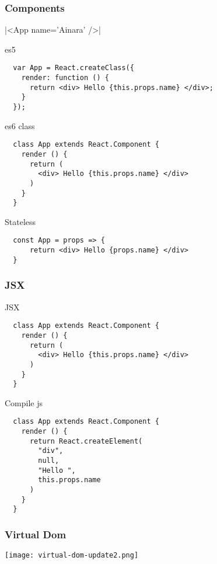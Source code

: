 \begin{frame}[fragile]

  \frametitle{Components}
  |<App name='Ainara' />|

  es5
  \begin{verbatim}
  var App = React.createClass({
    render: function () {
      return <div> Hello {this.props.name} </div>;
    }
  });
  \end{verbatim}

  es6 class
  \begin{verbatim}
  class App extends React.Component {
    render () {
      return (
        <div> Hello {this.props.name} </div>
      )
    }
  }
  \end{verbatim}

  Stateless
  \begin{verbatim}
  const App = props => {
      return <div> Hello {props.name} </div>
  }
  \end{verbatim}

\end{frame}


\begin{frame}[fragile]

  \frametitle{JSX}

  JSX
  \begin{verbatim}
  class App extends React.Component {
    render () {
      return (
        <div> Hello {this.props.name} </div>
      )
    }
  }
  \end{verbatim}


  Compile js
  \begin{verbatim}
  class App extends React.Component {
    render () {
      return React.createElement(
        "div",
        null,
        "Hello ",
        this.props.name
      )
    }
  }
  \end{verbatim}

\end{frame}

\begin{frame}

  \frametitle{Virtual Dom}

  \texttt{[image: virtual-dom-update2.png]}

\end{frame}

